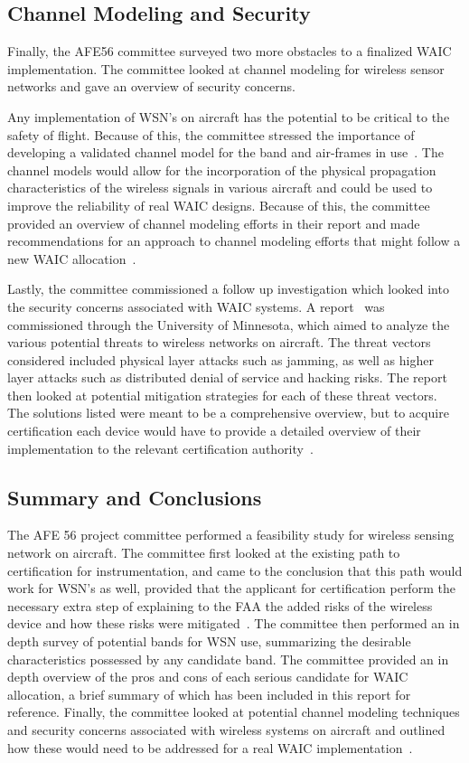 \subsection{Channel Modeling and Security}
Finally, the AFE56 committee surveyed two more obstacles to a finalized WAIC implementation. The committee looked at channel modeling for wireless sensor networks and  gave an overview of security concerns. 

Any implementation of WSN's on aircraft has the potential to be critical to the safety of flight. Because of this, the committee stressed the importance of  developing a validated channel model for the band and air-frames in use~\cite{ferrell_feasibility_2007}. The channel models would allow for the incorporation of the physical propagation characteristics of the wireless signals in various aircraft and could be used to improve the reliability of real WAIC designs. Because of this, the committee provided an overview of channel modeling efforts in their report and made recommendations for an approach to channel modeling efforts that might follow a new WAIC allocation~\cite{ferrell_feasibility_2007}. 

Lastly, the committee commissioned a follow up investigation which looked into the security concerns associated with WAIC systems. A report~\cite{tewfik_university_2009} was commissioned through the University of Minnesota, which aimed to analyze the various potential threats to wireless networks on aircraft. The threat vectors considered included physical layer attacks such as jamming, as well as higher layer attacks such as distributed denial of service and hacking risks. The report then looked at potential mitigation strategies for each of these threat vectors. The solutions listed were meant to be a comprehensive overview, but to acquire certification each device would have to provide a detailed overview of their implementation to the relevant certification authority~\cite{tewfik_university_2009}. 

\subsection{Summary and Conclusions}
The AFE 56 project committee performed a feasibility study for wireless sensing network on aircraft. The committee first looked at the existing path to certification for instrumentation, and came to the conclusion that this path would work for WSN's as well, provided that the applicant for certification perform the necessary extra step of explaining to the FAA the added risks of the wireless device and how these risks were mitigated~\cite{ferrell_feasibility_2007}. The committee then performed an in depth survey of potential bands for WSN use, summarizing the desirable characteristics possessed by any candidate band. The committee provided an in depth overview of the pros and cons of each serious candidate for WAIC allocation, a brief summary of which has been included in this report for reference. Finally, the  committee looked at potential channel modeling techniques and security concerns associated with wireless systems on aircraft and outlined how these would need to be addressed for a real WAIC implementation~\cite{tewfik_university_2009}. 

